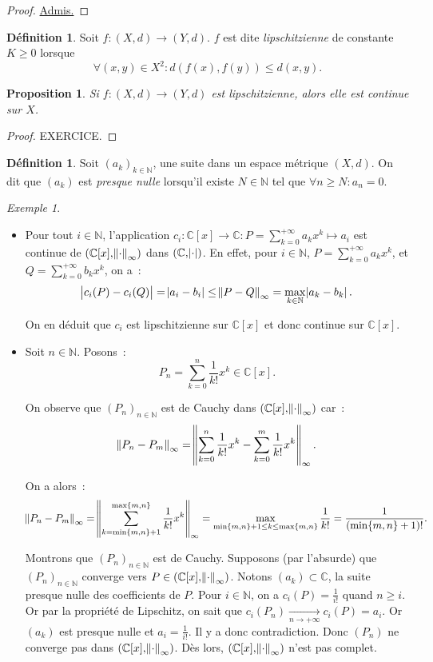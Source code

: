 \documentclass{report}
\newtheorem{prp}[thm]{Proposition}
\theoremstyle{definition}
\newtheorem{déf}[thm]{Définition}
\theoremstyle{remark}
\newtheorem{ex}{Exemple}[chapter]
\newcommand{\C}{\mathbb C}
\newcommand{\N}{\mathbb N}
\newcommand{\seq}[3]{\left(#1_{#2}\right)_{#2 \in #3}}
\newcommand{\mconv}[3]{\xrightarrow[#1 \to #2]{#3}}
\newcommand{\pinfty}{{+\infty}}
\newcommand{\grantedproof}{\begin{proof} \underline{Admis.} \end{proof}}
\begin{document}
				\grantedproof

				\begin{déf} Soit $f : (X, d) \to (Y, d)$. $f$ est dite \textit{lipschitzienne} de constante $K \geq 0$ lorsque~
				\[\forall (x, y) \in X^2 : d(f(x), f(y)) \leq d(x, y).\]
				\end{déf}

				\begin{prp} Si $f : (X, d) \to (Y, d)$ est lipschitzienne, alors elle est continue sur $X$. \end{prp}

				\begin{proof} EXERCICE.
				\end{proof}

				\begin{déf} Soit $\seq ak\N$, une suite dans un espace métrique $(X, d)$. On dit que $(a_k)$ est \textit{presque nulle} lorsqu'il existe
				$N \in \N$ tel que $\forall n \geq N : a_n = 0$. \end{déf}

				\begin{ex}~
				\begin{itemize}
					\item Pour tout $i \in \N$, l'application $c_i : \C[x] \to \C : P = \sum_{k=0}^\pinfty a_kx^k \mapsto a_i$ est continue de
					      $(\C[x], \norm \cdot_\infty)$ dans $(\C, \abs \cdot)$. En effet, pour $i \in \N$, $P = \sum_{k=0}^\pinfty a_kx^k$, et
					      $Q = \sum_{k=0}^\pinfty b_kx^k$, on a~:
						  \[\abs{c_i(P) - c_i(Q)} = \abs{a_i - b_i} \leq \norm{P-Q}_\infty = \max_{k \in \N}\abs{a_k - b_k}.\]

					      On en déduit que $c_i$ est lipschitzienne sur $\C[x]$ et donc continue sur $\C[x]$.
					\item Soit $n \in \N$. Posons~:
					      \[P_n = \sum_{k=0}^n\frac 1{k!}x^k \in \C[x].\]

					      On observe que $\seq Pn\N$ est de Cauchy dans $(\C[x], \norm \cdot_\infty)$ car~:
					      \[\norm{P_n - P_m}_\infty = \norm{\sum_{k=0}^n\frac 1{k!}x^k - \sum_{k=0}^m\frac 1{k!}x^k}_\infty.\]

					      On a alors~:
					      \[\norm{P_n - P_m}_\infty = \norm {\sum_{k=\min\{m, n\}+1}^{\max\{m, n\}}\frac 1{k!}x^k}_\infty =
					      	\max_{\min\{m, n\}+1 \leq k \leq \max\{m, n\}}\frac 1{k!} = \frac 1{(\min\{m, n\}+1)!}.\]

					      Montrons que $\seq Pn\N$ est de Cauchy. Supposons (par l'absurde) que $\seq Pn\N$ converge vers $P \in (\C[x], \norm \cdot_\infty)$.
					      Notons $(a_k) \subset \C$, la suite presque nulle des coefficients de $P$. Pour $i \in \N$, on a $c_i(P) = \frac 1{i!}$ quand
					      $n \geq i$. Or par la propriété de Lipschitz, on sait que $c_i(P_n) \mconv n\pinfty{} c_i(P) = a_i$. Or $(a_k)$ est presque nulle et
					      $a_i = \frac 1{i!}$. Il y a donc contradiction. Donc $(P_n)$ ne converge pas dans $(\C[x], \norm \cdot_\infty)$. Dès lors,
					      $(\C[x], \norm \cdot_\infty)$ n'est pas complet.
				\end{itemize}
				\end{ex}
\end{document}
